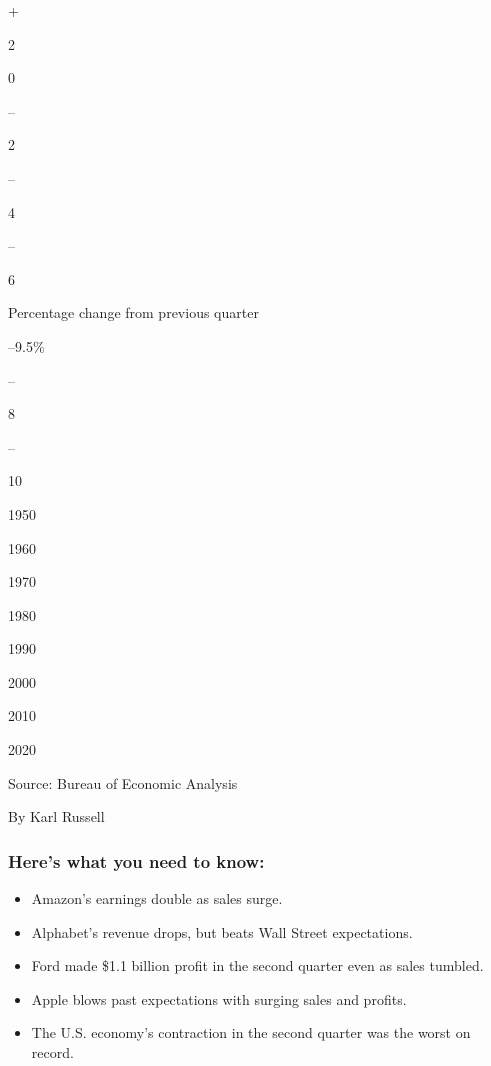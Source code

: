+

2

0

--

2

--

4

--

6

Percentage change from previous quarter

--9.5\%

--

8

--

10

1950

1960

1970

1980

1990

2000

2010

2020

Source: Bureau of Economic Analysis

By Karl Russell

\hypertarget{heres-what-you-need-to-know}{%
\subsubsection{Here's what you need to
know:}\label{heres-what-you-need-to-know}}

\begin{itemize}
\item
  \protect\hyperlink{amazons-earnings-double-as-sales-surge}{}

  Amazon's earnings double as sales surge.
\item
  \protect\hyperlink{alphabets-revenue-drops-but-beats-wall-street-expectations}{}

  Alphabet's revenue drops, but beats Wall Street expectations.
\item
  \protect\hyperlink{ford-made-1-1-billion-profit-in-the-second-quarter-even-as-sales-tumbled}{}

  Ford made \$1.1 billion profit in the second quarter even as sales
  tumbled.
\item
  \protect\hyperlink{apple-blows-past-expectations-with-surging-sales-and-profits}{}

  Apple blows past expectations with surging sales and profits.
\item
  \protect\hyperlink{the-us-economys-contraction-in-the-second-quarter-was-the-worst-on-record}{}

  The U.S. economy's contraction in the second quarter was the worst on
  record.
\end{itemize}

